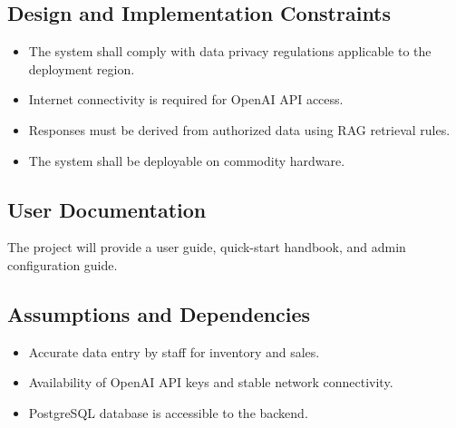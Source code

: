 \subsection{Design and Implementation Constraints}
\begin{itemize}
    \item The system shall comply with data privacy regulations applicable to the deployment region.
    \item Internet connectivity is required for OpenAI API access.
    \item Responses must be derived from authorized data using RAG retrieval rules.
    \item The system shall be deployable on commodity hardware.
\end{itemize}

\subsection{User Documentation}
The project will provide a user guide, quick-start handbook, and admin configuration guide.

\subsection{Assumptions and Dependencies}
\begin{itemize}
    \item Accurate data entry by staff for inventory and sales.
    \item Availability of OpenAI API keys and stable network connectivity.
    \item PostgreSQL database is accessible to the backend.
\end{itemize}
